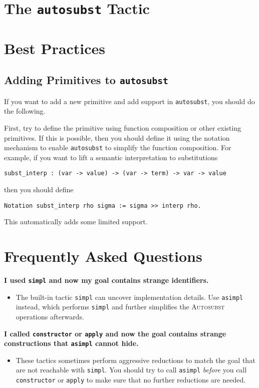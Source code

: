 \documentclass{scrartcl}
\newcommand{\faq}[2]{\vspace{\topsep}\noindent\textbf{#1}\\\vspace{-\topsep}\begin{itemize}[nolistsep]\item[]{#2}\end{itemize}}
\newcommand{\Autosubst}{\textsc{Autosubst}\xspace}
\newcommand{\lst}{\lstinline}
\begin{document}
\section{The \lst$autosubst$ Tactic}
\label{sec:lstautosubst-tactic}

\section{Best Practices}
\label{sec:best-practices}

\subsection{Adding Primitives to \lst$autosubst$}
\label{sec:adding-prim}

If you want to add a new primitive and add support in \lst$autosubst$, you should do the following.

First, try to define the primitive using function composition or other existing primitives.
If this is possible, then you should define it using the notation mechanism to enable \lst$autosubst$ to simplify the function composition.
For example, if you want to lift a semantic interpretation to substitutions 
\begin{lstlisting}
subst_interp : (var -> value) -> (var -> term) -> var -> value  
\end{lstlisting}
then you should define
\begin{lstlisting}
Notation subst_interp rho sigma := sigma >> interp rho.
\end{lstlisting}
This automatically adds some limited support.


\section{Frequently Asked Questions}
\label{sec:faq}

\faq{I used \lst$simpl$ and now my goal contains strange identifiers.}
{The built-in tactic \lst$simpl$ can uncover implementation details. Use \lst$asimpl$ instead, which performs \lst$simpl$ and further simplifies the \Autosubst operations afterwards.}

\faq{I called \lst$constructor$ or \lst$apply$ and now the goal contains strange constructions that \lst$asimpl$ cannot hide.}
{These tactics sometimes perform aggressive reductions to match the goal that are not reachable with \lst$simpl$. You should try to call \lst$asimpl$ \emph{before} you call \lst$constructor$ or \lst$apply$ to make sure that no further reductions are needed.
}
\end{document}
